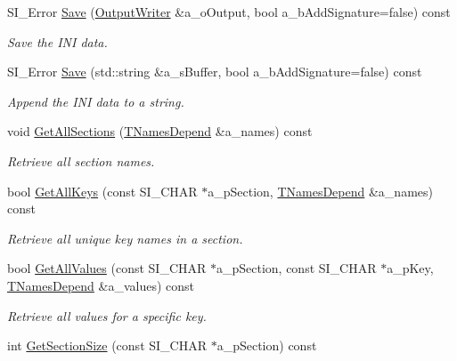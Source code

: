 \begin{DoxyCompactItemize}
S\+I\+\_\+\+Error \hyperlink{class_c_simple_ini_templ_a5fea5d590edbb5eef694991c7c355915}{Save} (\hyperlink{class_c_simple_ini_templ_1_1_output_writer}{Output\+Writer} \&a\+\_\+o\+Output, bool a\+\_\+b\+Add\+Signature=false) const 
\begin{DoxyCompactList}\small\item\em Save the I\+NI data. \end{DoxyCompactList}\item 
S\+I\+\_\+\+Error \hyperlink{class_c_simple_ini_templ_af944674fb44473ede150a3bcdc103d63}{Save} (std\+::string \&a\+\_\+s\+Buffer, bool a\+\_\+b\+Add\+Signature=false) const 
\begin{DoxyCompactList}\small\item\em Append the I\+NI data to a string. \end{DoxyCompactList}\item 
void \hyperlink{class_c_simple_ini_templ_a65b01b5bf88d0dfe3ba51f12278cbcb8}{Get\+All\+Sections} (\hyperlink{class_c_simple_ini_templ_a391b3f3751e06cd9e9de4fb16ac14342}{T\+Names\+Depend} \&a\+\_\+names) const 
\begin{DoxyCompactList}\small\item\em Retrieve all section names. \end{DoxyCompactList}\item 
bool \hyperlink{class_c_simple_ini_templ_a8cf1357d78d28653b68790ab5d5b45f1}{Get\+All\+Keys} (const S\+I\+\_\+\+C\+H\+AR $\ast$a\+\_\+p\+Section, \hyperlink{class_c_simple_ini_templ_a391b3f3751e06cd9e9de4fb16ac14342}{T\+Names\+Depend} \&a\+\_\+names) const 
\begin{DoxyCompactList}\small\item\em Retrieve all unique key names in a section. \end{DoxyCompactList}\item 
bool \hyperlink{class_c_simple_ini_templ_a263c85a8cd839c315fefc078e048257b}{Get\+All\+Values} (const S\+I\+\_\+\+C\+H\+AR $\ast$a\+\_\+p\+Section, const S\+I\+\_\+\+C\+H\+AR $\ast$a\+\_\+p\+Key, \hyperlink{class_c_simple_ini_templ_a391b3f3751e06cd9e9de4fb16ac14342}{T\+Names\+Depend} \&a\+\_\+values) const 
\begin{DoxyCompactList}\small\item\em Retrieve all values for a specific key. \end{DoxyCompactList}\item 
int \hyperlink{class_c_simple_ini_templ_a2e612d67d1e1631c157af6291ac8c348}{Get\+Section\+Size} (const S\+I\+\_\+\+C\+H\+AR $\ast$a\+\_\+p\+Section) const 

\end{DoxyCompactItemize}
